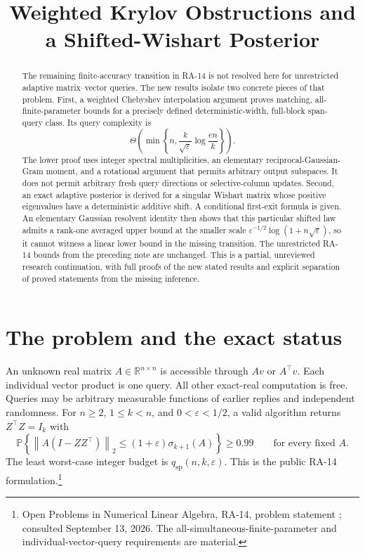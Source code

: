 \documentclass[11pt]{article}
\title{Weighted Krylov Obstructions and a Shifted-Wishart Posterior}
\author{}
\date{}
\theoremstyle{definition}
\newcommand{\R}{\mathbb R}
\newcommand{\Prob}{\mathbb P}
\newcommand{\qsp}{q_{\mathrm{sp}}}
\newcommand{\norm}[1]{\left\lVert#1\right\rVert}
\begin{document}
\maketitle
\vspace{-2em}
\begin{abstract}
The remaining finite-accuracy transition in RA-14 is not resolved here for unrestricted adaptive matrix--vector queries. The new results isolate two concrete pieces of that problem. First, a weighted Chebyshev interpolation argument proves matching, all-finite-parameter bounds for a precisely defined deterministic-width, full-block span-query class. Its query complexity is
\[
\Theta\!\left(\min\left\{n,\frac{k}{\sqrt\varepsilon}\log\frac{en}{k}\right\}\right).
\]
The lower proof uses integer spectral multiplicities, an elementary reciprocal-Gaussian-Gram moment, and a rotational argument that permits arbitrary output subspaces. It does not permit arbitrary fresh query directions or selective-column updates. Second, an exact adaptive posterior is derived for a singular Wishart matrix whose positive eigenvalues have a deterministic additive shift. A conditional first-exit formula is given. An elementary Gaussian resolvent identity then shows that this particular shifted law admits a rank-one averaged upper bound at the smaller scale $\varepsilon^{-1/2}\log(1+n\sqrt\varepsilon)$, so it cannot witness a linear lower bound in the missing transition. The unrestricted RA-14 bounds from the preceding note are unchanged. This is a partial, unreviewed research continuation, with full proofs of the new stated results and explicit separation of proved statements from the missing inference.
\end{abstract}
\setcounter{tocdepth}{1}
\begingroup\small
\setlength{\parskip}{0pt}
\makeatletter
\renewcommand*{\l@section}[2]{\@dottedtocline{1}{0em}{2.3em}{#1}{#2}}
\makeatother
\tableofcontents
\endgroup
\newpage

\section{The problem and the exact status}
An unknown real matrix $A\in\R^{n\times n}$ is accessible through $Av$ or $A^\top v$. Each individual vector product is one query. All other exact-real computation is free. Queries may be arbitrary measurable functions of earlier replies and independent randomness. For $n\ge2$, $1\le k<n$, and $0<\varepsilon<1/2$, a valid algorithm returns $Z^\top Z=I_k$ with
\begin{equation}\label{eq:target}
\Prob\left\{\norm{A(I-ZZ^\top)}_2\le(1+\varepsilon)\sigma_{k+1}(A)\right\}\ge0.99
\qquad\text{for every fixed }A.
\end{equation}
The least worst-case integer budget is $\qsp(n,k,\varepsilon)$. This is the public RA-14 formulation.\footnote{Open Problems in Numerical Linear Algebra, RA-14, problem statement \cite{repo}; consulted September 13, 2026. The all-simultaneous-finite-parameter and individual-vector-query requirements are material.}
\end{document}
